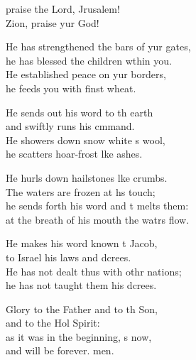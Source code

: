 \settowidth{\versewidth}{He has strengthened the bars of your gates, *}
\begin{psalmverse}%
  \begin{patverse}
     praise the Lord, Jrusalem!\Med\\
    Zion, praise yur God!
    
    He has strengthened the bars of yur gates,\Med\\
    he has blessed the children w\pointup{\i}thin you.\\
    He established peace on yur borders,\Med\\
    he feeds you with finst wheat.
    
    He sends out his word to th earth\Med\\
    and swiftly runs his cmmand.\\
    He showers down snow white s wool,\Med\\
    he scatters hoar-frost l\pointup{\i}ke ashes.
    
    He hurls down hailstones l\pointup{\i}ke crumbs.\Med\\
    The waters are frozen at h\pointup{\i}s touch;\\
    he sends forth his word and \pointup{\i}t melts them:\Med\\
    at the breath of his mouth the watrs flow.
    
    He makes his word known t Jacob,\Med\\
    to Israel his laws and dcrees.\\
    He has not dealt thus with othr nations;\Med\\
    he has not taught them his dcrees.
    
    Glory to the Father and to th Son,\Med\\
    and to the Hol Spirit:\\
    as it was in the beginning, \pointup{\i}s now,\Med\\
    and will be forever. men.
  \end{patverse}
\end{psalmverse}
